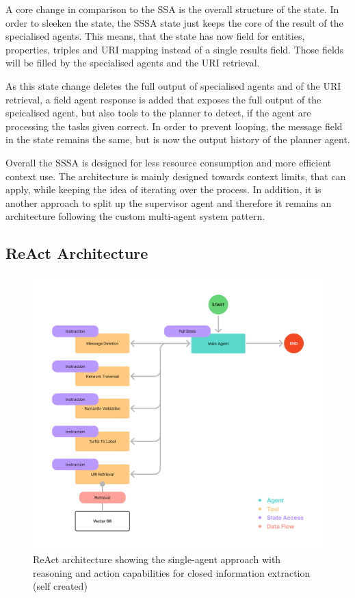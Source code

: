 \documentclass[a4paper,oneside,bibliography=totoc]{scrbook}
\begin{document}
A core change in comparison to the \ac{SSA} is the overall structure of the state. In order to sleeken the state, the \ac{SSSA} state just keeps the core of the result of the specialised agents. This means, that the state has now field for entities, properties, triples and URI mapping instead of a single results field. Those fields will be filled by the specialised agents and the URI retrieval.

As this state change deletes the full output of specialised agents and of the URI retrieval, a field agent response is added that exposes the full output of the speicalised agent, but also tools to the planner to detect, if the agent are processing the tasks given correct. In order to prevent looping, the message field in the state remains the same, but is now the output history of the planner agent.

Overall the \ac{SSSA} is designed for less resource consumption and more efficient context use. The architecture is mainly designed towards context limits, that can apply, while keeping the idea of iterating over the process. In addition, it is another approach to split up the supervisor agent and therefore it remains an architecture following the custom multi-agent system pattern.


\subsection{ReAct Architecture}
\label{subsec:react}

\begin{figure}[h]
  \centering
  \includegraphics[width=\textwidth]{figures/ReAct Architecture.png}
  \caption[ReAct architecture showing the single-agent approach with reasoning and action capabilities for closed information extraction]{ReAct architecture showing the single-agent approach with reasoning and action capabilities for closed information extraction (self created)}
  \label{fig:react_architecture}
\end{figure}
\end{document}
